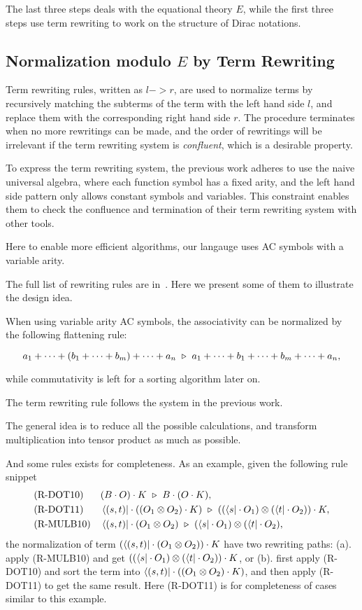 \documentclass[runningheads]{llncs}
\begin{document}


The last three steps deals with the equational theory $E$, while the first three steps use term rewriting to work on the structure of Dirac notations.


\subsection{Normalization modulo $E$ by Term Rewriting}
Term rewriting rules, written as $l -> r$, are used to normalize terms by recursively matching the subterms of the term with the left hand side $l$, and replace them with the corresponding right hand side $r$. The procedure terminates when no more rewritings can be made, and the order of rewritings will be irrelevant if the term rewriting system is \textit{confluent}, which is a desirable property.

To express the term rewriting system, the previous work adheres to use the naive universal algebra, where each function symbol has a fixed arity, and the left hand side pattern only allows constant symbols and variables. This constraint enables them to check the confluence and termination of their term rewriting system with other tools.

Here to enable more efficient algorithms, our langauge uses AC symbols with a variable arity.

The full list of rewriting rules are in~. Here we present some of them to illustrate the design idea.

When using variable arity AC symbols, the associativity can be normalized by the following flattening rule:

\[
a_1 + \cdots + (b_1 + \cdots + b_m) + \cdots + a_n
\ \triangleright\ a_1 + \cdots + b_1 + \cdots + b_m + \cdots + a_n,
\]

while commutativity is left for a sorting algorithm later on.

The term rewriting rule follows the system in the previous work.

The general idea is to reduce all the possible calculations, and transform multiplication into tensor product as much as possible.

And some rules exists for completeness. As an example, given the following rule snippet
\begin{align*}
    & \text{(R-DOT10)}
    && (B \cdot O) \cdot K \ \triangleright\ B \cdot (O \cdot K), \\
    & \text{(R-DOT11)}
    && \bra{(s, t)} \cdot ((O_1 \otimes O_2) \cdot K) \ \triangleright\ ((\bra{s} \cdot O_1) \otimes (\bra{t} \cdot O_2)) \cdot K, \\
    & \text{(R-MULB10)}
    && \bra{(s, t)} \cdot (O_1 \otimes O_2)\ \triangleright\ (\bra{s} \cdot O_1) \otimes (\bra{t} \cdot O_2),
\end{align*}
the normalization of term $(\bra{(s, t)} \cdot (O_1 \otimes O_2)) \cdot K$ have two rewriting paths: (a). apply (R-MULB10) and get $((\bra{s} \cdot O_1) \otimes (\bra{t} \cdot O_2)) \cdot K$, or
(b). first apply (R-DOT10) and sort the term into $\bra{(s, t)} \cdot ((O_1 \otimes O_2) \cdot K)$, and then apply (R-DOT11) to get the same result. Here (R-DOT11) is for completeness of cases similar to this example.
\end{document}
